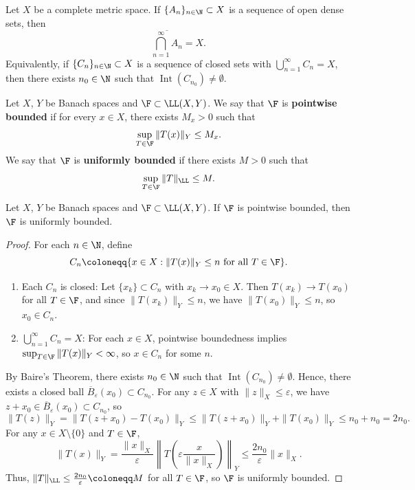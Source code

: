 \begin{theorem}
Let $X$ be a complete metric space.  
If $\{A_n\}_{n \in \N} \subset X$ is a sequence of open dense sets, then  
\[
\overline{\bigcap_{n=1}^\infty A_n} = X.
\]
Equivalently, if $\{C_n\}_{n \in \N} \subset X$ is a sequence of closed sets with $\bigcup_{n=1}^\infty C_n = X$,  
then there exists $n_0 \in \N$ such that $\operatorname{Int}(C_{n_0}) \neq \emptyset$.
\end{theorem}

\begin{definition}
Let $X$, $Y$ be Banach spaces and $\F \subset \LL(X,Y)$.  
We say that $\F$ is \textbf{pointwise bounded} if for every $x \in X$, there exists $M_x > 0$ such that  
\[
\sup_{T \in \F} \|T(x)\|_Y \leq M_x.
\]
We say that $\F$ is \textbf{uniformly bounded} if there exists $M > 0$ such that  
\[
\sup_{T \in \F} \|T\|_{\LL} \leq M.
\]
\end{definition}

\begin{theorem}
Let $X$, $Y$ be Banach spaces and $\F \subset \LL(X,Y)$.  
If $\F$ is pointwise bounded, then $\F$ is uniformly bounded.
\end{theorem}

\begin{proof}
For each $n \in \N$, define  
\[
C_n \coloneqq \{ x \in X : \|T(x)\|_Y \leq n \text{ for all } T \in \F \}.
\]
\begin{enumerate}
    \item Each $C_n$ is closed:  
          Let $\{x_k\} \subset C_n$ with $x_k \to x_0 \in X$.  
          Then $T(x_k) \to T(x_0)$ for all $T \in \F$, and since $\|T(x_k)\|_Y \leq n$,  
          we have $\|T(x_0)\|_Y \leq n$, so $x_0 \in C_n$.
    
    \item $\bigcup_{n=1}^\infty C_n = X$:  
          For each $x \in X$, pointwise boundedness implies $\sup_{T \in \F} \|T(x)\|_Y < \infty$,  
          so $x \in C_n$ for some $n$.
\end{enumerate}
By Baire's Theorem, there exists $n_0 \in \N$ such that $\operatorname{Int}(C_{n_0}) \neq \emptyset$.  
Hence, there exists a closed ball $\overline{B}_\varepsilon(x_0) \subset C_{n_0}$.  
For any $z \in X$ with $\|z\|_X \leq \varepsilon$, we have $z + x_0 \in \overline{B}_\varepsilon(x_0) \subset C_{n_0}$, so  
\[
\|T(z)\|_Y = \|T(z + x_0) - T(x_0)\|_Y \leq \|T(z + x_0)\|_Y + \|T(x_0)\|_Y \leq n_0 + n_0 = 2n_0.
\]
For any $x \in X \setminus \{0\}$ and $T \in \F$,  
\[
\|T(x)\|_Y = \frac{\|x\|_X}{\varepsilon} \left\| T\left( \varepsilon \frac{x}{\|x\|_X} \right) \right\|_Y \leq \frac{2n_0}{\varepsilon} \|x\|_X.
\]
Thus, $\|T\|_{\LL} \leq \frac{2n_0}{\varepsilon} \coloneqq M$ for all $T \in \F$, so $\F$ is uniformly bounded.
\end{proof}

